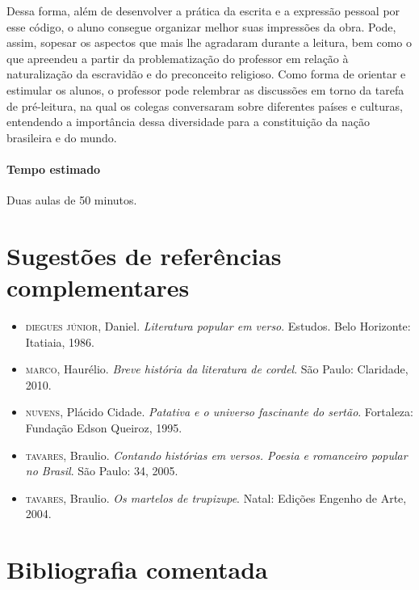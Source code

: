 \documentclass[11pt]{extarticle}
\begin{document}
Dessa forma, além de desenvolver a prática da escrita e a expressão pessoal por esse código, o aluno consegue organizar melhor suas impressões da obra. Pode, assim, sopesar os aspectos que mais lhe agradaram durante a leitura, bem como o que apreendeu a partir da problematização do professor em relação à naturalização da escravidão e do preconceito religioso. Como forma de orientar e estimular os alunos, o professor pode relembrar as discussões em torno da tarefa de pré-leitura, na qual os colegas conversaram sobre diferentes países e culturas, entendendo a importância dessa diversidade para a constituição da nação brasileira e do mundo.

\paragraph{Tempo estimado} Duas aulas de 50 minutos.


\section{Sugestões de referências complementares}


\begin{itemize}
\item \textsc{diegues júnior}, Daniel. \textit{Literatura popular em verso}. Estudos. Belo Horizonte: Itatiaia, 1986. 

\item \textsc{marco}, Haurélio. \textit{Breve história da literatura de cordel}. São Paulo: Claridade, 2010.

\item \textsc{nuvens}, Plácido Cidade. \textit{Patativa e o universo fascinante
do sertão}. Fortaleza: Fundação Edson Queiroz, 1995.

\item \textsc{tavares}, Braulio. \textit{Contando histórias em versos. Poesia e romanceiro popular no Brasil}. São Paulo: 34, 2005.

\item \textsc{tavares}, Braulio. \textit{Os martelos de trupizupe}. Natal: Edições Engenho de Arte, 2004.
\end{itemize}

\section{Bibliografia comentada}
\end{document}
